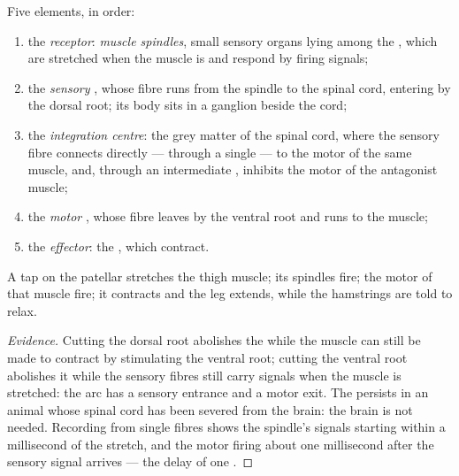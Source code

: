 \begin{proposition}\label{prop:g12:stretch-reflex:arc}
Five elements, in order:
\begin{enumerate}
  \item the \emph{receptor}: \emph{muscle spindles}, small sensory
        organs lying among the , which are stretched
        when the muscle is and respond by firing signals;
  \item the \emph{sensory }, whose fibre runs from the spindle
        to the spinal cord, entering by the dorsal root; its  body
        sits in a ganglion beside the cord;
  \item the \emph{integration centre}: the grey matter of the spinal
        cord, where the sensory fibre connects directly --- through a
        single  --- to the motor  of the same muscle, and,
        through an intermediate , inhibits the motor  of
        the antagonist muscle;
  \item the \emph{motor }, whose fibre leaves by the ventral
        root and runs to the muscle;
  \item the \emph{effector}: the , which contract.
\end{enumerate}
A tap on the patellar  stretches the thigh muscle; its
spindles fire; the motor  of that muscle fire; it contracts and
the leg extends, while the hamstrings are told to relax.
\end{proposition}
\begin{proof}[Evidence]
Cutting the dorsal root abolishes the  while the muscle can
still be made to contract by stimulating the ventral root; cutting the
ventral root abolishes it while the sensory fibres still carry signals
when the muscle is stretched: the arc has a sensory entrance and a
motor exit. The  persists in an animal whose spinal cord has
been severed from the brain: the brain is not needed. Recording from
single fibres shows the spindle's signals starting within a
millisecond of the stretch, and the motor  firing about one
millisecond after the sensory signal arrives --- the delay of one
.
\end{proof}


